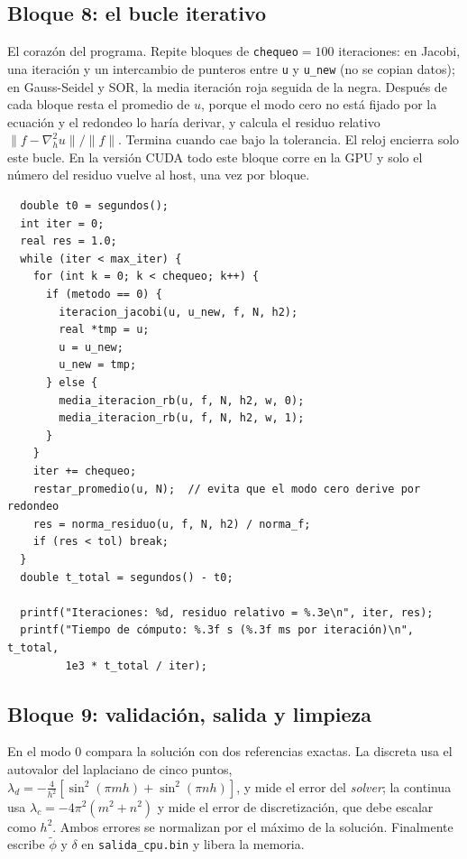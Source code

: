 \begin{appendix}
\subsection{Bloque 8: el bucle iterativo}

El corazón del programa. Repite bloques de \texttt{chequeo}$=100$ iteraciones: en Jacobi, una iteración y un intercambio de punteros entre \texttt{u} y \texttt{u\_new} (no se copian datos); en Gauss-Seidel y SOR, la media iteración roja seguida de la negra. Después de cada bloque resta el promedio de $u$, porque el modo cero no está fijado por la ecuación y el redondeo lo haría derivar, y calcula el residuo relativo $\|f-\nabla_h^2u\|/\|f\|$. Termina cuando cae bajo la tolerancia. El reloj encierra solo este bucle. En la versión CUDA todo este bloque corre en la GPU y solo el número del residuo vuelve al host, una vez por bloque.

\begin{lstlisting}
  double t0 = segundos();
  int iter = 0;
  real res = 1.0;
  while (iter < max_iter) {
    for (int k = 0; k < chequeo; k++) {
      if (metodo == 0) {
        iteracion_jacobi(u, u_new, f, N, h2);
        real *tmp = u;
        u = u_new;
        u_new = tmp;
      } else {
        media_iteracion_rb(u, f, N, h2, w, 0);
        media_iteracion_rb(u, f, N, h2, w, 1);
      }
    }
    iter += chequeo;
    restar_promedio(u, N);  // evita que el modo cero derive por redondeo
    res = norma_residuo(u, f, N, h2) / norma_f;
    if (res < tol) break;
  }
  double t_total = segundos() - t0;

  printf("Iteraciones: %d, residuo relativo = %.3e\n", iter, res);
  printf("Tiempo de cómputo: %.3f s (%.3f ms por iteración)\n", t_total,
         1e3 * t_total / iter);
\end{lstlisting}

\subsection{Bloque 9: validación, salida y limpieza}

En el modo 0 compara la solución con dos referencias exactas. La discreta usa el autovalor del laplaciano de cinco puntos, $\lambda_d=-\tfrac{4}{h^2}\left[\sin^2(\pi mh)+\sin^2(\pi nh)\right]$, y mide el error del \emph{solver}; la continua usa $\lambda_c=-4\pi^2(m^2+n^2)$ y mide el error de discretización, que debe escalar como $h^2$. Ambos errores se normalizan por el máximo de la solución. Finalmente escribe $\tilde\phi$ y $\delta$ en \texttt{salida\_cpu.bin} y libera la memoria.


\end{appendix}
